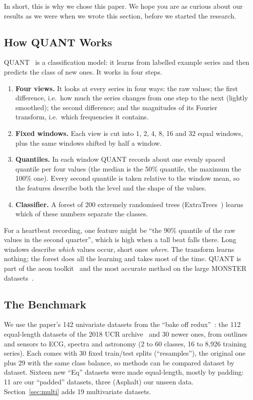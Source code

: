 \documentclass[conference]{IEEEtran}
\begin{document}
In short, this is why we chose this paper. We hope you are as curious about our results as we were when we wrote this section, before we started the research.

\subsection{How QUANT Works}
QUANT~\cite{quant} is a classification model: it learns from labelled example series and then predicts the class of new ones. It works in four steps.
\begin{enumerate}
\item \textbf{Four views.} It looks at every series in four ways: the raw values; the first difference, i.e.\ how much the series changes from one step to the next (lightly smoothed); the second difference; and the magnitudes of its Fourier transform, i.e.\ which frequencies it contains.
\item \textbf{Fixed windows.} Each view is cut into 1, 2, 4, 8, 16 and 32 equal windows, plus the same windows shifted by half a window.
\item \textbf{Quantiles.} In each window QUANT records about one evenly spaced quantile per four values (the median is the 50\% quantile, the maximum the 100\% one). Every second quantile is taken relative to the window mean, so the features describe both the level and the shape of the values.
\item \textbf{Classifier.} A forest of 200 extremely randomised trees (ExtraTrees~\cite{extratrees}) learns which of these numbers separate the classes.
\end{enumerate}
For a heartbeat recording, one feature might be ``the 90\% quantile of the raw values in the second quarter'', which is high when a tall beat falls there. Long windows describe \emph{which} values occur, short ones \emph{where}. The transform learns nothing; the forest does all the learning and takes most of the time. QUANT is part of the aeon toolkit~\cite{aeon} and the most accurate method on the large MONSTER datasets~\cite{monster}.

\subsection{The Benchmark}
We use the paper's 142 univariate datasets from the ``bake off redux''~\cite{middlehurst2024bakeoff}: the 112 equal-length datasets of the 2018 UCR archive~\cite{ucr} and 30 newer ones, from outlines and sensors to ECG, spectra and astronomy (2 to 60 classes, 16 to 8,926 training series). Each comes with 30 fixed train/test splits (``resamples''), the original one plus 29 with the same class balance, so methods can be compared dataset by dataset. Sixteen new ``Eq'' datasets were made equal-length, mostly by padding: 11 are our ``padded'' datasets, three (Asphalt) our unseen data. Section~\ref{sec:multi} adds 19 multivariate datasets.
\end{document}

